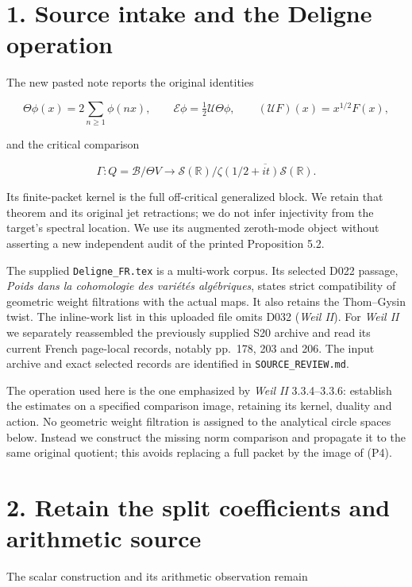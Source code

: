 \documentclass[
]{article}
\begin{document}
\section{1. Source intake and the Deligne
operation}\label{source-intake-and-the-deligne-operation}

The new pasted note reports the original identities

\[
\Theta\phi(x)=2\sum_{n\ge1}\phi(nx),\qquad
\mathcal E\phi=\tfrac12\mathcal U\Theta\phi,\qquad
(\mathcal UF)(x)=x^{1/2}F(x), \tag{P3}
\]

and the critical comparison

\[
\Gamma:Q=\mathscr B/\Theta V\longrightarrow
\mathcal S(\mathbb R)/\overline{\zeta(1/2+it)\mathcal S(\mathbb R)}.
\tag{P4}
\]

Its finite-packet kernel is the full off-critical generalized block. We
retain that theorem and its original jet retractions; we do not infer
injectivity from the target's spectral location. We use its augmented
zeroth-mode object without asserting a new independent audit of the
printed Proposition 5.2.

The supplied \texttt{Deligne\_FR.tex} is a multi-work corpus. Its
selected D022 passage, \emph{Poids dans la cohomologie des variétés
algébriques}, states strict compatibility of geometric weight
filtrations with the actual maps. It also retains the Thom--Gysin twist.
The inline-work list in this uploaded file omits D032 (\emph{Weil II}).
For \emph{Weil II} we separately reassembled the previously supplied S20
archive and read its current French page-local records, notably pp.~178,
203 and 206. The input archive and exact selected records are identified
in \texttt{SOURCE\_REVIEW.md}.

The operation used here is the one emphasized by \emph{Weil II}
3.3.4--3.3.6: establish the estimates on a specified comparison image,
retaining its kernel, duality and action. No geometric weight filtration
is assigned to the analytical circle spaces below. Instead we construct
the missing norm comparison and propagate it to the same original
quotient; this avoids replacing a full packet by the image of (P4).

\section{2. Retain the split coefficients and arithmetic
source}\label{retain-the-split-coefficients-and-arithmetic-source}

The scalar construction and its arithmetic observation remain
\end{document}
